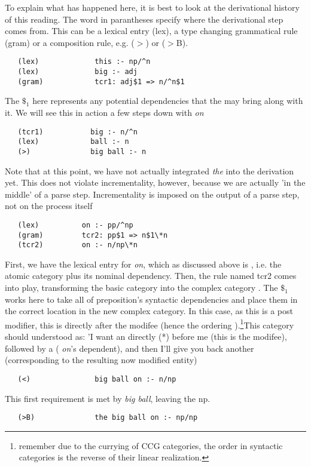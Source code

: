 To explain what has happened here, it is best to look at the derivational history of this reading. The word in parantheses specify where the derivational step comes from. This can be a lexical entry (lex), a type changing grammatical rule (gram) or a composition rule, e.g. (\ensuremath{>}) or (\ensuremath{>}B). 
\begin{verbatim}
   (lex)             this :- np/^n
   (lex)             big :- adj
   (gram)            tcr1: adj$1 => n/^n$1
\end{verbatim}
The \ensuremath{\$_{1}} here represents any potential dependencies that the  may bring along with it. We will see this in action a few steps down with \emph{on}
\begin{verbatim}
   (tcr1)           big :- n/^n
   (lex)            ball :- n
   (>)              big ball :- n
\end{verbatim}
Note that at this point, we have not actually integrated \emph{the} into the derivation yet. This does not violate incrementality, however, because we are actually 'in the middle' of a parse step. Incrementality is imposed on the output of a parse step, not on the process itself 
\begin{verbatim}
   (lex)          on :- pp/^np
   (gram)         tcr2: pp$1 => n$1\*n
   (tcr2)         on :- n/np\*n
\end{verbatim}
First, we have the lexical entry for \emph{on}, which as discussed above is , i.e. the atomic category plus its nominal dependency. Then, the rule named tcr2 comes into play, transforming the basic category into the complex category  . The \ensuremath{\$_{1}}works here to take all of preposition's syntactic dependencies and place them in the correct location in the new complex category. In this case, as this is a post modifier, this is directly after the modifee (hence the ordering ).\footnote{remember due to the currying of CCG categories, the order in syntactic categories is the reverse of their linear realization.}This category should understood as: 'I want an  directly (*) before me (this is the modifee), followed by a  ( \emph{on}'s dependent), and then I'll give you back another  (corresponding to the resulting now modified entity)
\begin{verbatim}
   (<)               big ball on :- n/np
\end{verbatim}
This first  requirement is met by \emph{big ball}, leaving the np.
\begin{verbatim}
   (>B)              the big ball on :- np/np
\end{verbatim}
